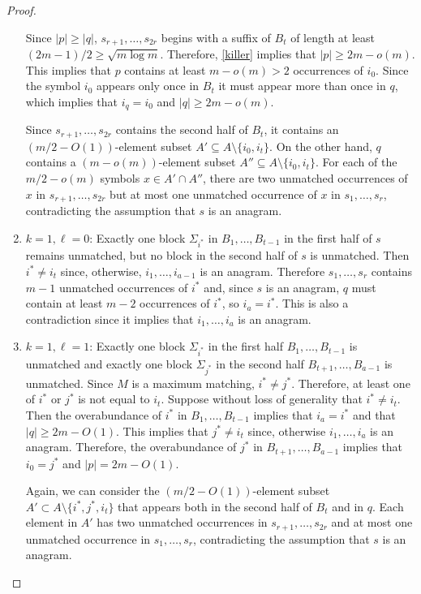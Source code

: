 \documentclass[kpfonts]{patmorin}
\begin{document}
\begin{proof}
\begin{enumerate}
        Since $|p|\ge |q|$, $s_{r+1},\ldots,s_{2r}$ begins with a suffix of $B_t$ of length at least $(2m-1)/2 \ge \sqrt{m\log m}$. Therefore, \cref{killer} implies that $|p|\ge 2m-o(m)$.  This implies that $p$ contains at least $m-o(m)>2$ occurrences of $i_0$.  Since the symbol $i_0$ appears only once in $B_t$ it must appear more than once in $q$, which implies that $i_q=i_0$ and $|q|\ge 2m-o(m)$.

        Since $s_{r+1},\ldots,s_{2r}$ contains the second half of $B_t$, it contains an $(m/2-O(1))$-element subset $A'\subseteq A\setminus\{i_0,i_t\}$. On the other hand, $q$ contains a $(m-o(m))$-element subset $A''\subseteq A\setminus\{i_0,i_t\}$.  For each of the $m/2-o(m)$ symbols $x\in A'\cap A''$, there are two unmatched occurrences of $x$ in $s_{r+1},\ldots,s_{2r}$ but at most one unmatched occurrence of $x$ in $s_1,\ldots,s_r$, contradicting the assumption that $s$ is an anagram.

        \item $k=1,\ell=0$: Exactly one block $\Sigma_{i^*}$ in $B_1,\ldots,B_{t-1}$ in the first half of $s$ remains unmatched, but no block in the second half of $s$ is unmatched.  Then $i^*\neq i_t$ since, otherwise, $i_1,\ldots,i_{a-1}$ is an anagram. Therefore $s_1,\ldots,s_r$ contains $m-1$ unmatched occurrences of $i^*$ and, since $s$ is an anagram, $q$ must contain at least $m-2$ occurrences of $i^*$, so $i_a=i^*$.  This is also a contradiction since it implies that $i_1,\ldots,i_a$ is an anagram.

        \item $k=1,\ell=1$: Exactly one block $\Sigma_{i^*}$ in the first half $B_1,\ldots,B_{t-1}$ is unmatched and exactly one block $\Sigma_{j^*}$ in the second half $B_{t+1},\ldots,B_{a-1}$ is unmatched. Since $M$ is a maximum matching, $i^*\neq j^*$.  Therefore, at least one of $i^*$ or $j^*$ is not equal to $i_t$.  Suppose without loss of generality that $i^*\neq i_t$. Then the overabundance of $i^*$ in $B_{1},\ldots,B_{t-1}$ implies that $i_a=i^*$ and that $|q|\ge 2m-O(1)$.  This implies that $j^*\neq i_t$ since, otherwise $i_1,\ldots,i_a$ is an anagram.  Therefore, the overabundance of $j^*$ in $B_{t+1},\ldots,B_{a-1}$ implies that  $i_0=j^*$ and $|p|= 2m-O(1)$.

        Again, we can consider the $(m/2-O(1))$-element subset $A'\subset A\setminus\{i^*,j^*,i_t\}$ that appears both in the second half of $B_t$ and in $q$.  Each element in $A'$ has two unmatched occurrences in $s_{r+1},\ldots,s_{2r}$ and at most one unmatched occurrence in $s_1,\ldots,s_r$, contradicting the assumption that $s$ is an anagram.


\end{enumerate}
\end{proof}
\end{document}

